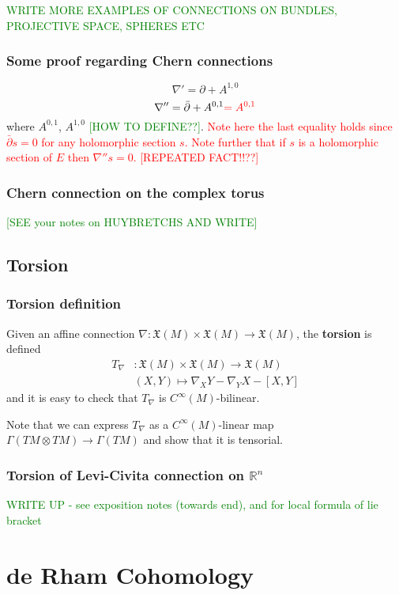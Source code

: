 \documentclass[a4paper]{article}
\theoremstyle{definition} \newtheorem*{definition}{Definition}
\theoremstyle{definition} \newtheorem*{definitions}{Definitions}
\theoremstyle{plain} \newtheorem{theorem}{Theorem}[section]
\theoremstyle{plain} \newtheorem{proposition}[theorem]{Proposition}
\theoremstyle{plain} \newtheorem{corollary}[theorem]{Corollary}
\theoremstyle{plain} \newtheorem{lemma}[theorem]{Lemma}
\theoremstyle{plain} \newtheorem{example}[theorem]{Example}
\newcommand{\checkCorrect}[1]{\textcolor{red}{#1}}
\newcommand{\finish}[1]{\textcolor{green}{#1}}
\newcommand{\defn}[1]{\textbf{#1}}
\newcommand{\realnos}{\mathbb{R}}
\newcommand{\smooth}{C^\infty}
\begin{document}
\finish{WRITE MORE EXAMPLES OF CONNECTIONS ON BUNDLES, PROJECTIVE SPACE, SPHERES ETC}

\subsubsection{Some proof regarding Chern connections}

$$\nabla ' = \partial + A^{1,0}$$
$$\nabla '' = \bar{\partial} + A^{0,1} \checkCorrect{= A^{0,1}}$$
where $A^{0,1}$, $A^{1, 0}$ \finish{[HOW TO DEFINE??]}. \checkCorrect{Note here the last equality holds since  $\bar{\partial}s=0$ for any holomorphic section $s$. Note further that if $s$ is a holomorphic section of $E$ then $\nabla '' s =0$. [REPEATED FACT!!??]}

\subsubsection{Chern connection on the complex torus}
\finish{[SEE your notes on HUYBRETCHS AND WRITE]}


\subsection{Torsion}
\subsubsection{Torsion definition}
Given an affine connection $\nabla:\mathfrak{X}(M) \times \mathfrak{X}(M)\to \mathfrak{X}(M)$, the \defn{torsion} is defined
\begin{align*}
T_\nabla & : \mathfrak{X}(M)\times \mathfrak{X}(M)\to \mathfrak{X}(M)\\
& (X, Y)\mapsto \nabla_X Y - \nabla_Y X - [X, Y]
\end{align*}
and it is easy to check that $T_\nabla$ is $\smooth (M)$-bilinear.

Note that we can express $T_\nabla$ as a $\smooth (M)$-linear map $\Gamma(TM\otimes TM)\to \Gamma(TM)$ and show that it is tensorial. 

\subsubsection{Torsion of Levi-Civita connection on $\realnos^n$}
\finish{WRITE UP - see exposition notes (towards end), and for local formula of lie bracket}

\section{de Rham Cohomology}
\end{document}

